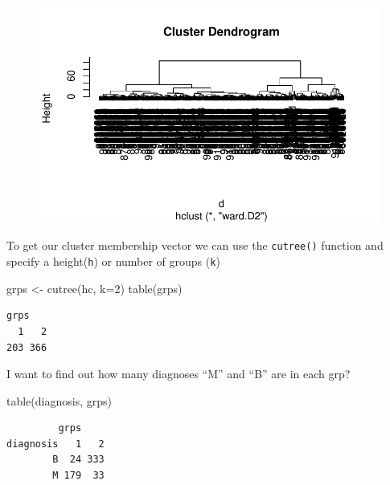 \documentclass[
  letterpaper,
  DIV=11,
  numbers=noendperiod]{scrartcl}
\newenvironment{Shaded}{\begin{snugshade}}{\end{snugshade}}
\newcommand{\AttributeTok}[1]{\textcolor[rgb]{0.40,0.45,0.13}{#1}}
\newcommand{\DecValTok}[1]{\textcolor[rgb]{0.68,0.00,0.00}{#1}}
\newcommand{\FunctionTok}[1]{\textcolor[rgb]{0.28,0.35,0.67}{#1}}
\newcommand{\NormalTok}[1]{\textcolor[rgb]{0.00,0.23,0.31}{#1}}
\newcommand{\OtherTok}[1]{\textcolor[rgb]{0.00,0.23,0.31}{#1}}
\begin{document}
\begin{figure}[H]

{\centering \includegraphics{Class-8-mini-project_files/figure-pdf/unnamed-chunk-13-1.pdf}

}

\end{figure}

To get our cluster membership vector we can use the \texttt{cutree()}
function and specify a height(\texttt{h}) or number of groups
(\texttt{k})

\begin{Shaded}
\begin{Highlighting}[]
\NormalTok{grps }\OtherTok{\textless{}{-}} \FunctionTok{cutree}\NormalTok{(hc, }\AttributeTok{k=}\DecValTok{2}\NormalTok{)}
\FunctionTok{table}\NormalTok{(grps)}
\end{Highlighting}
\end{Shaded}

\begin{verbatim}
grps
  1   2 
203 366 
\end{verbatim}

I want to find out how many diagnoses ``M'' and ``B'' are in each grp?

\begin{Shaded}
\begin{Highlighting}[]
\FunctionTok{table}\NormalTok{(diagnosis, grps)}
\end{Highlighting}
\end{Shaded}

\begin{verbatim}
         grps
diagnosis   1   2
        B  24 333
        M 179  33
\end{verbatim}
\end{document}
